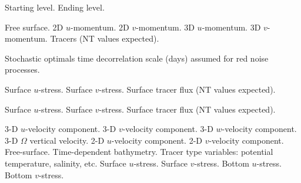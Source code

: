 \begin{klist}
\begin{klist}
        Starting level.
        Ending level.
     \end{klist}
    \mbox{}
     \begin{klist}
        Free surface.
        2D $u$-momentum.
        2D $v$-momentum.
        3D $u$-momentum.
        3D $v$-momentum.
        Tracers (NT values expected).
     \end{klist}
    \mbox{}
     \begin{klist}
         Stochastic optimals time decorrelation
       scale (days) assumed for red noise processes.
     \end{klist}
    \mbox{}
     \begin{klist}
         Surface $u$-stress.
         Surface $v$-stress.
        Surface tracer flux (NT values expected).
     \end{klist}
    \mbox{}
     \begin{klist}
        Surface $u$-stress.
        Surface $v$-stress.
        Surface tracer flux (NT values
       expected).
     \end{klist}
    \mbox{}
     \begin{klist}
           3-D $u$-velocity component.
           3-D $v$-velocity component.
           3-D $w$-velocity component.
           3-D $\Omega$ vertical velocity.
         2-D $u$-velocity component.
         2-D $v$-velocity component.
            Free-surface.
            Time-dependent bathymetry.
\vspace{2 mm}
            Tracer type variables: potential
    temperature, salinity, etc.
\vspace{2 mm}
          Surface $u$-stress.
          Surface $v$-stress.
          Bottom $u$-stress.
          Bottom $v$-stress.

\end{klist}
\end{klist}
